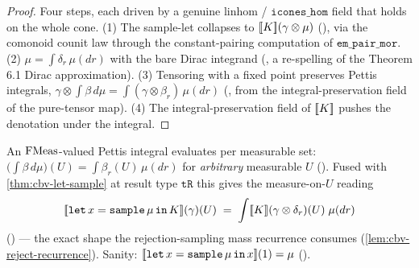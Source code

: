 \begin{proof}
Four steps, each driven by a genuine $\mathrm{linhom}$ /
$\mathtt{icones\_hom}$ field that holds on the whole cone. (1) The
sample-let collapses to
$[\![ K ]\!](\gamma \otimes \mu)$
(),
via the comonoid counit law through the constant-pairing computation
of $\mathtt{em\_pair\_mor}$. (2) $\mu = \int \delta_r\,\mu(dr)$ with
the bare Dirac integrand
(,
a re-spelling of the Theorem 6.1 Dirac approximation). (3) Tensoring
with a fixed point preserves Pettis integrals,
$\gamma \otimes \int \beta\,d\mu = \int (\gamma \otimes \beta_r)\,
\mu(dr)$
(,
from the integral-preservation field of the pure-tensor map). (4) The
integral-preservation field of $[\![ K ]\!]$ pushes the denotation under
the integral.
\end{proof}

\begin{lemma}%
\label{lem:cbv-let-sample-mu}
\rocqok
{}\rocqok
{}\rocqok
{}
An $\mathrm{FMeas}$-valued Pettis integral evaluates per measurable set:
$\bigl(\int \beta\,d\mu\bigr)(U) = \int \beta_r(U)\,\mu(dr)$ for
\emph{arbitrary} measurable $U$
().
Fused with \autoref{thm:cbv-let-sample} at result type $\mathtt{tR}$
this gives the measure-on-$U$ reading
\[
  [\![ \mathtt{let}\,x = \mathtt{sample}\,\mu\,\mathtt{in}\,K ]\!]
    (\gamma)(U)
  \;=\;
  \int [\![ K ]\!](\gamma \otimes \delta_r)(U)\;\mu(dr)
\]
() ---
the exact shape the rejection-sampling mass recurrence consumes
(\autoref{lem:cbv-reject-recurrence}). Sanity:
$[\![ \mathtt{let}\,x = \mathtt{sample}\,\mu\,\mathtt{in}\,x ]\!](1) =
\mu$
().
\end{lemma}

